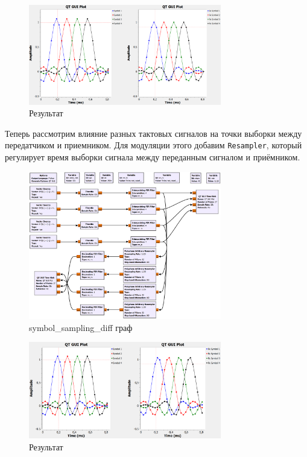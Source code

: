 \documentclass[a4paper,12pt]{article}
\begin{document}
	\begin{figure}[H]
		\centering
		\includegraphics[width=0.75\textwidth]{3_2.png}
		\caption{Результат}
		\label{fig:3.2}
	\end{figure}
	
	Теперь рассмотрим влияние разных тактовых сигналов на точки выборки между передатчиком и приемником. Для модуляции этого добавим \texttt{Resampler}, который регулирует время выборки сигнала между переданным сигналом и приёмником.
	
	\begin{figure}[H]
		\centering
		\includegraphics[width=0.75\textwidth]{3_3.png}
		\caption{symbol\_sampling\_diff граф}
		\label{fig:3.3}
	\end{figure}

	\begin{figure}[H]
		\centering
		\includegraphics[width=0.75\textwidth]{3_4.png}
		\caption{Результат}
		\label{fig:3.4}
	\end{figure}
	
\end{document}
